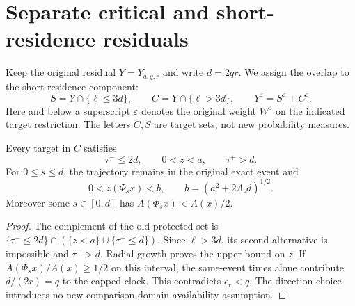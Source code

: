 \section{Separate critical and short-residence residuals}
\label{sec:v98-critical}
Keep the original residual $Y=Y_{a,q,r}$ and write $d=2qr$.
We assign the overlap to the short-residence component:
\begin{equation}\label{eq:v98-disjoint-residual}
 S=Y\cap\{\ell\le3d\},\qquad
 C=Y\cap\{\ell>3d\},\qquad
 Y^\varepsilon=S^\varepsilon+C^\varepsilon.
\end{equation}
Here and below a superscript $\varepsilon$ denotes the original
weight $W^\varepsilon$ on the indicated target restriction. The
letters $C,S$ are target sets, not new probability measures.

\begin{lemma}
\label{lem:v98-critical-interval}
Every target in $C$ satisfies
\begin{equation}\label{eq:v98-critical-support}
 \tau^-\le2d,\qquad 0<z<a,\qquad \tau^+>d.
\end{equation}
For $0\le s\le d$, the trajectory remains in the original exact
event and
\[
 0<z(\Phi_sx)<b,\qquad b=(a^2+2\Lambda_\circ d)^{1/2}.
\]
Moreover some $s\in[0,d]$ has $A(\Phi_sx)<A(x)/2$.
\end{lemma}
\begin{proof}
The complement of the old protected set is
$\{\tau^-\le2d\}\cap(\{z<a\}\cup\{\tau^+\le d\})$.
Since $\ell>3d$, its second alternative is impossible and
$\tau^+>d$. Radial growth proves the upper bound on $z$.
If $A(\Phi_sx)/A(x)\ge1/2$ on this interval, the same-event times
alone contribute $d/(2r)=q$ to the capped clock. This contradicts
$c_r<q$. The direction choice introduces no new comparison-domain
availability assumption.
\end{proof}

